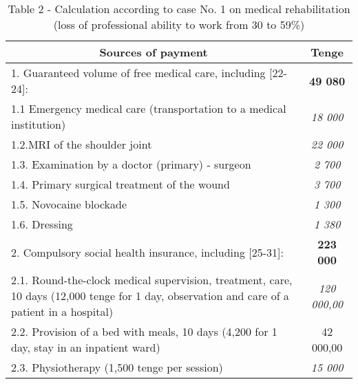 \begin{table}[H]
\caption*{Table 2 - Calculation according to case No. 1 on medical rehabilitation (loss of professional ability to work from 30 to 59\%)}
\centering
\begin{tabular}{|p{}|c|}
\hline
\multicolumn{1}{|c|}{\textbf{Sources of payment}}                                                                        & \textbf{Tenge}     \\ \hline
1. Guaranteed volume of free medical care, including {[}22-24{]}:                                                        & \textbf{49 080}    \\ \hline
1.1 Emergency medical care (transportation to a medical institution)                                                     & \textit{18 000}    \\ \hline
1.2.MRI of the shoulder joint                                                                                            & \textit{22 000}    \\ \hline
1.3. Examination by a doctor (primary) - surgeon                                                                         & \textit{2 700}     \\ \hline
1.4. Primary surgical treatment of the wound                                                                             & \textit{3 700}     \\ \hline
1.5. Novocaine blockade                                                                                                  & \textit{1 300}     \\ \hline
1.6. Dressing                                                                                                            & \textit{1 380}     \\ \hline
2. Compulsory social health insurance, including {[}25-31{]}:                                                            & \textbf{223 000}   \\ \hline
2.1. Round-the-clock medical supervision, treatment, care, 10 days (12,000 tenge for 1 day, observation and care of a patient in a hospital) & \textit{120 000,00} \\ \hline
2.2. Provision of a bed with meals, 10 days (4,200 for 1 day, stay in an inpatient ward)                                 & 42 000,00          \\ \hline
2.3. Physiotherapy (1,500 tenge per session)                                                                             & \textit{15 000}    \\ \hline

\end{tabular}
\end{table}

